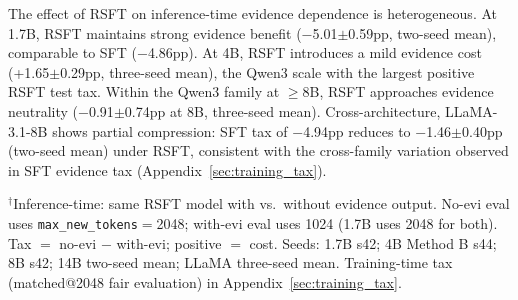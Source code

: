 The effect of RSFT on inference-time evidence dependence is heterogeneous. At 1.7B, RSFT maintains strong evidence benefit ($-$5.01$\pm$0.59pp, two-seed mean), comparable to SFT ($-$4.86pp). At 4B, RSFT introduces a mild evidence cost (+1.65$\pm$0.29pp, three-seed mean), the Qwen3 scale with the largest positive RSFT test tax. Within the Qwen3 family at $\geq$8B, RSFT approaches evidence neutrality ($-$0.91$\pm$0.74pp at 8B, three-seed mean). Cross-architecture, LLaMA-3.1-8B shows partial compression: SFT tax of $-$4.94pp reduces to $-$1.46$\pm$0.40pp (two-seed mean) under RSFT, consistent with the cross-family variation observed in SFT evidence tax (Appendix~\ref{sec:training_tax}).

\begin{table}[t]
\centering
\caption{RSFT performance and inference-time evidence tax across model scales (DocRED dev Ign-F1). LLaMA-3.1-8B included for cross-family validation. Mean $\pm$ std$^{(\text{seeds})}$.}
\label{tab:scaling}
\small
{}
\vspace{-2mm}
{\raggedright\footnotesize $^\dagger$Inference-time: same RSFT model with vs.\ without evidence output. No-evi eval uses \texttt{max\_new\_tokens}$=$2048; with-evi eval uses 1024 (1.7B uses 2048 for both). Tax $=$ no-evi $-$ with-evi; positive $=$ cost. Seeds: 1.7B s42; 4B Method B s44; 8B s42; 14B two-seed mean; LLaMA three-seed mean. Training-time tax (matched@2048 fair evaluation) in Appendix~\ref{sec:training_tax}.\par}
\end{table}

